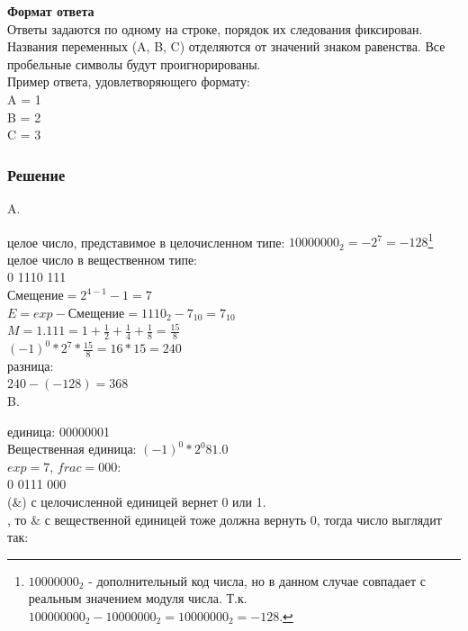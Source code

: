 \documentclass[12pt, letterpaper]{article}
\begin{document}
\textbf{Формат ответа}\\
Ответы задаются по одному на строке, порядок их следования фиксирован. Названия переменных (A, B, C) отделяются от значений знаком равенства. Все пробельные символы будут проигнорированы.\\

Пример ответа, удовлетворяющего формату:\\
A = 1\\
B = 2\\
C = 3
\newpage
\subsubsection{Решение}
\noindent A.

\setlength{\leftskip}{1cm}
 целое число, представимое в целочисленном типе: $10000000_2 = -2^7 = -128$\footnote{$10000000_2$ - дополнительный код числа, но в данном случае совпадает с реальным значением модуля числа. Т.к. $100000000_2 - 10000000_2 = 10000000_2 = -128$.}\\

 целое число в вещественном типе:\\
0 1110 111\\
$\text{Смещение} = 2^{4 - 1} - 1 = 7$\\
$E = exp - \text{Смещение} = 1110_2 - 7_{10} = 7_{10}$\\
$M = 1.111 = 1 + \frac{1}{2} + \frac{1}{4} + \frac{1}{8} = \frac{15}{8}$\\
$(-1)^0 * 2^7 * \frac{15}{8} = 16 * 15 = 240$\\

 разница:\\
$240 - (-128) = 368$\\

\setlength{\leftskip}{0cm}
\noindent B.

\setlength{\leftskip}{1cm}
 единица: 00000001\\
Вещественная единица: $(-1)^0 * 2^0 8 1.0$\\
$exp = 7$, $frac = 000$:\\
0 0111 000\\

 (\&) с целочисленной единицей вернет 0 или 1.\\

, то \& с вещественной единицей тоже должна вернуть 0, тогда число выглядит так:\\
\end{document}
